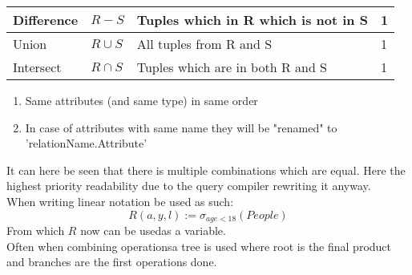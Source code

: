 \documentclass[12pt, a4paper]{article}
\begin{document}
\begin{table}[h!]
\begin{tabular}{|l|l|l|l|}
		Difference & $R- S$               & Tuples which in R which is not in S                                                                         & 1           \\ \hline		
		Union      & $R\cup S$            & All tuples from R and S                                                                                     & 1           \\ \hline
		Intersect  & $R\cap S$            & Tuples which are in both R and S                                                                            & 1           \\ \hline
		\end{tabular}
		\end{table}
		\begin{enumerate}
			\item Same attributes (and same type) in same order
			\item In case of attributes with same name they will be "renamed" to 'relationName.Attribute'
		\end{enumerate}
		It can here be seen that there is multiple combinations which are equal. Here the highest priority readability due to the query compiler rewriting it anyway.\\
		When writing linear notation be used as such:
		$$R(a,y,l):=\sigma_{age<18}(People)$$
		From which $R$ now can be usedas a variable.\\
		Often when combining operationsa tree is used where root is the final product and branches are the first operations done.
\end{document}
